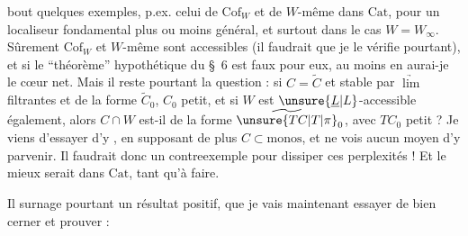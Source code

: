 bout quelques exemples, p.ex. celui de $\mathrm{Cof}_{W}$ et de $W$-même dans $\mathrm{Cat}$, pour un localiseur fondamental plus ou moins général, et surtout dans le cas $W=W_\infty$. Sûrement $\mathrm{Cof}_{W}$ et $W$-même sont accessibles (il faudrait que je le vérifie pourtant), et si le ``théorème'' hypothétique du \S~6 est faux pour eux, au moins en aurai-je le cœur net. Mais il reste pourtant la question : si $C=\widetilde C$ et stable par $\underrightarrow{\lim}$ filtrantes et de la forme $\widetilde C_0$, $C_0$ petit, et si $W$ est $\unsure{\underline L|L}$-accessible également, alors $C\cap W$ est-il  de la forme $\widetilde{\unsure{TC|T|\pi}}_0$, avec $TC_0$ petit ? Je viens  d'essayer d'y , en supposant de plus $C\subset\mathrm{monos}$, et ne vois aucun moyen d'y parvenir. Il faudrait donc un contreexemple pour dissiper ces perplexités ! Et le mieux serait dans $\mathrm{Cat}$, tant qu'à faire.

Il surnage pourtant un résultat  positif, que je vais maintenant essayer de bien cerner et prouver :
